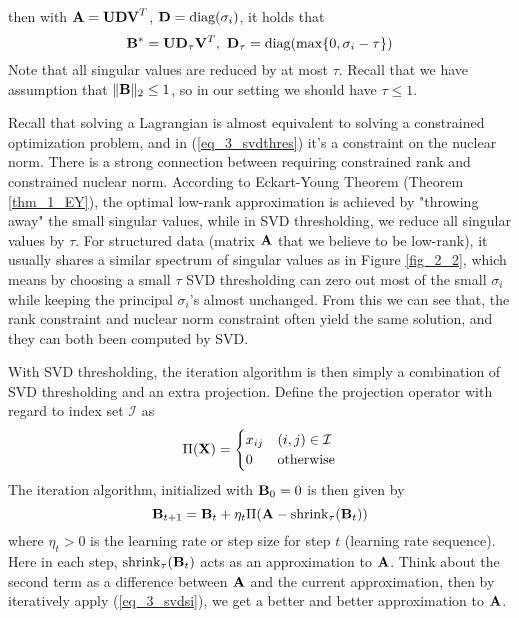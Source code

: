 \documentclass[../main.tex]{subfiles}
\begin{document}
then with ${\bf A}={\bf UDV}^T$, ${\bf D}=\text{diag}(\sigma_i)$, it holds that
\begin{equation*}
{\bf B}^* = {\bf UD}_{\tau}{\bf V}^T,\ {\bf D}_{\tau}=\text{diag}(\max\{0, \sigma_i-\tau\})
\end{equation*}
Note that all singular values are reduced by at most $\tau$. Recall that we have assumption that $\|{\bf B}\|_2\leq 1$, so in our setting we should have $\tau \leq 1$.
\par Recall that solving a Lagrangian is almost equivalent to solving a constrained optimization problem, and in (\ref{eq_3_svdthres}) it's a constraint on the nuclear norm. There is a strong connection between requiring constrained rank and constrained nuclear norm. According to Eckart-Young Theorem (Theorem \ref{thm_1_EY}), the optimal low-rank approximation is achieved by "throwing away" the small singular values, while in SVD thresholding, we reduce all singular values by $\tau$. For structured data (matrix ${\bf A}$ that we believe to be low-rank),  it usually shares a similar spectrum of singular values as in Figure \ref{fig_2_2}, which means by choosing a small $\tau$ SVD thresholding can zero out most of the small $\sigma_i$ while keeping the principal $\sigma_i$'s almost unchanged. From this we can see that, the rank constraint and nuclear norm constraint often yield the same solution, and they can both been computed by SVD.
\par With SVD thresholding, the iteration algorithm is then simply a combination of SVD thresholding and an extra projection. Define the projection operator with regard to index set $\mathcal{I}$ as
\begin{equation*}
\Pi({\bf X})=\begin{cases}
x_{ij} & (i,j)\in \mathcal{I}\\
0 & \text{otherwise}
\end{cases}
\end{equation*} 
The iteration algorithm, initialized with ${\bf B}_0=0$ is then given by
\begin{equation}\label{eq_3_svdsi}
{\bf B}_{t+1} = {\bf B}_t + \eta_t\Pi({\bf A}-\text{shrink}_{\tau}({\bf B}_t))
\end{equation}
where $\eta_t>0$ is the learning rate or step size for step $t$ (learning rate sequence). Here in each step, $\text{shrink}_{\tau}({\bf B}_t)$ acts as an approximation to ${\bf A}$. Think about the second term as a difference between ${\bf A}$ and the current approximation, then by iteratively apply (\ref{eq_3_svdsi}), we get a better and better approximation to ${\bf A}$. 
\end{document}
